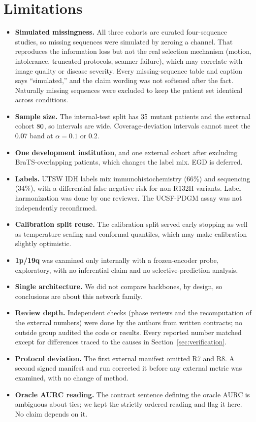\documentclass[journal]{IEEEtran}
\begin{document}
\section{Limitations}
\label{sec:limits}
\begin{itemize}[leftmargin=1.2em]
\item \textbf{Simulated missingness.} All three cohorts are curated four-sequence studies, so missing sequences were simulated by zeroing a channel. That reproduces the information loss but not the real selection mechanism (motion, intolerance, truncated protocols, scanner failure), which may correlate with image quality or disease severity. Every missing-sequence table and caption says ``simulated,'' and the claim wording was not softened after the fact. Naturally missing sequences were excluded to keep the patient set identical across conditions.
\item \textbf{Sample size.} The internal-test split has $35$ mutant patients and the external cohort $80$, so intervals are wide. Coverage-deviation intervals cannot meet the 0.07 band at $\alpha=0.1$ or 0.2.
\item \textbf{One development institution}, and one external cohort after excluding BraTS-overlapping patients, which changes the label mix. EGD is deferred.
\item \textbf{Labels.} UTSW IDH labels mix immunohistochemistry (66\%) and sequencing (34\%), with a differential false-negative risk for non-R132H variants. Label harmonization was done by one reviewer. The UCSF-PDGM assay was not independently reconfirmed.
\item \textbf{Calibration split reuse.} The calibration split served early stopping as well as temperature scaling and conformal quantiles, which may make calibration slightly optimistic.
\item \textbf{1p/19q} was examined only internally with a frozen-encoder probe, exploratory, with no inferential claim and no selective-prediction analysis.
\item \textbf{Single architecture.} We did not compare backbones, by design, so conclusions are about this network family.
\item \textbf{Review depth.} Independent checks (phase reviews and the recomputation of the external numbers) were done by the authors from written contracts; no outside group audited the code or results. Every reported number matched except for differences traced to the causes in Section~\ref{sec:verification}.
\item \textbf{Protocol deviation.} The first external manifest omitted R7 and R8. A second signed manifest and run corrected it before any external metric was examined, with no change of method.
\item \textbf{Oracle AURC reading.} The contract sentence defining the oracle AURC is ambiguous about ties; we kept the strictly ordered reading and flag it here. No claim depends on it.
\end{itemize}
\end{document}
